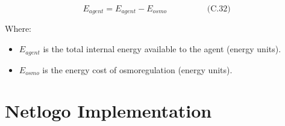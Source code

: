 \documentclass[
]{book}
\begin{document}
\[
\begin{equation} E_{agent} = E_{agent} - E_{osmo}  \hspace{2cm} \text{(C.32)} \end{equation}
\]

Where:

\begin{itemize}
\item
  \(E_{agent}\) is the total internal energy available to the agent
  (energy units).
\item
  \(E_{osmo}\) is the energy cost of osmoregulation (energy units).
\end{itemize}

\section{Netlogo Implementation}\label{netlogo-implementation-2}
\end{document}
